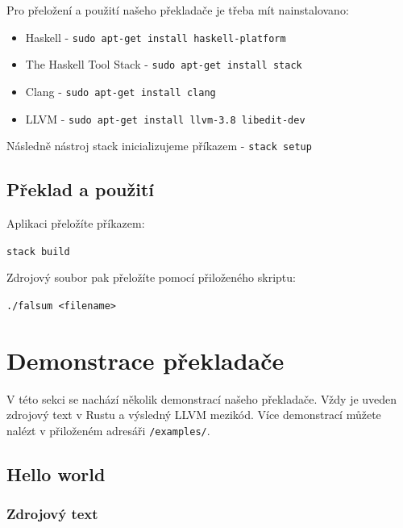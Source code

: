 \documentclass[12pt,a4paper]{article}
\begin{document}
Pro přeložení a použití našeho překladače je třeba mít nainstalovano:

\begin{itemize}
	\item Haskell - \texttt{sudo apt-get install haskell-platform}
    \item The Haskell Tool Stack - \texttt{sudo apt-get install stack}
    \item Clang - \texttt{sudo apt-get install clang}
    \item LLVM - \texttt{sudo apt-get install llvm-3.8 libedit-dev}
\end{itemize}

Následně nástroj stack inicializujeme příkazem - \texttt{stack setup}

\subsection{Překlad a použití}

Aplikaci přeložíte příkazem:

\begin{center}
	\texttt{stack build}
\end{center}

\noindent
Zdrojový soubor pak přeložíte pomocí přiloženého skriptu:

\begin{center}
	\texttt{./falsum <filename>}
\end{center}


\section{Demonstrace překladače}

V této sekci se nachází několik demonstrací našeho překladače. Vždy je uveden zdrojový text v Rustu a výsledný LLVM mezikód. Více demonstrací můžete nalézt v přiloženém adresáři \texttt{/examples/}.

\subsection{Hello world}

\subsubsection{Zdrojový text}
\end{document}
